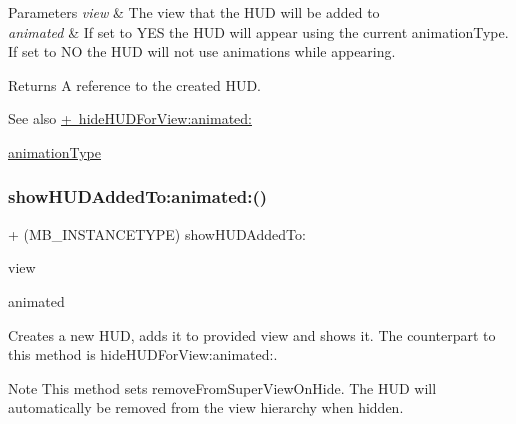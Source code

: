 \begin{DoxyParams}{Parameters}
{\em view} & The view that the H\+UD will be added to \\
\hline
{\em animated} & If set to Y\+ES the H\+UD will appear using the current animation\+Type. If set to NO the H\+UD will not use animations while appearing. \\
\hline
\end{DoxyParams}
\begin{DoxyReturn}{Returns}
A reference to the created H\+UD.
\end{DoxyReturn}
\begin{DoxySeeAlso}{See also}
\mbox{\hyperlink{interface_m_b_progress_h_u_d_a7b0826c34eea1a15d62aabd00c249666}{+ hide\+H\+U\+D\+For\+View\+:animated\+:}} 

\mbox{\hyperlink{interface_m_b_progress_h_u_d_a71d04bb9e2839df9377ad10d03b2e468}{animation\+Type}} 
\end{DoxySeeAlso}
\mbox{\label{interface_m_b_progress_h_u_d_a2a981df80fbbb85db0d6c660d5882292}} 
\subsubsection{\texorpdfstring{show\+H\+U\+D\+Added\+To\+:animated\+:()}{showHUDAddedTo:animated:()}\hspace{0.1cm}{\footnotesize\ttfamily [2/3]}}
{\footnotesize\ttfamily + (M\+B\+\_\+\+I\+N\+S\+T\+A\+N\+C\+E\+T\+Y\+PE) show\+H\+U\+D\+Added\+To\+: \begin{DoxyParamCaption}\item[{(U\+I\+View $\ast$)}]{view }\item[{animated:(B\+O\+OL)}]{animated }\end{DoxyParamCaption}}

Creates a new H\+UD, adds it to provided view and shows it. The counterpart to this method is hide\+H\+U\+D\+For\+View\+:animated\+:.

\begin{DoxyNote}{Note}
This method sets {\ttfamily remove\+From\+Super\+View\+On\+Hide}. The H\+UD will automatically be removed from the view hierarchy when hidden.
\end{DoxyNote}

